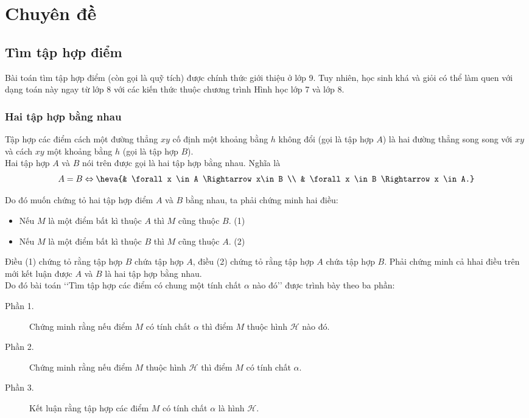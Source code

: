 \chapter{Chuyên đề}
\section{Tìm tập hợp điểm}
Bài toán tìm tập  hợp điểm (còn gọi là quỹ tích) được chính thức giới thiệu ở lớp 9. Tuy nhiên, học sinh khá và giỏi có thể làm quen với dạng toán này ngay từ lớp 8 với các kiến thức thuộc chương trình Hình học lớp 7 và lớp 8.
\subsection{Hai tập hợp bằng nhau}
	\begin{dn}
		Tập hợp các điểm cách một đường thẳng $xy$ cố định một khoảng bằng $h$ không đổi (gọi là tập hợp $A$) là hai đường thẳng song song với $xy$ và cách $xy$ một khoảng bằng $h$ (gọi là tập hợp $B$). \\
		Hai tập hợp $A$ và $B$ nói trên được gọi là hai tập hợp bằng nhau. Nghĩa là $$ A=B \Leftrightarrow \heva{& \forall x \in A \Rightarrow x\in B \\ & \forall x \in B \Rightarrow x \in A.} $$
	\end{dn}
	Do đó muốn chứng tỏ hai tập hợp điểm $A$ và $B$ bằng nhau, ta phải chứng minh hai điều:
	\begin{itemize}
		\item Nếu $M$ là một điểm bất kì thuộc $A$ thì $M$ cũng thuộc $B$. \hfill (1)
		\item Nếu $M$ là một điểm bất kì thuộc $B$ thì $M$ cũng thuộc $A$. \hfill (2)
	\end{itemize}
	Điều (1) chứng tỏ rằng tập hợp $B$ chứa tập hợp $A$, điều (2) chứng tỏ rằng tập hợp $A$ chứa tập hợp $B$. Phải chứng minh cả hhai điều trên mới kết luận được $A$ và $B$ là hai tập hợp bằng nhau. \\
	Do đó bài toán \lq\lq Tìm tập hợp các điểm có chung một tính chất $\alpha$ nào đó\rq\rq{} được trình bày theo ba phần:
	\begin{description}
		\item[Phần 1.] Chứng minh rằng nếu điểm $M$ có tính chất $\alpha$ thì điểm $M$ thuộc hình $\mathscr{H}$ nào đó.
		\item[Phần 2.] Chứng minh rằng nếu điểm $M$ thuộc hình $\mathscr{H}$ thì điểm $M$ có tính chất $\alpha$.
		\item[Phần 3.] Kết luận rằng tập hợp các điểm $M$ có tính chất $\alpha$ là hình $\mathscr{H}$.
	\end{description}

